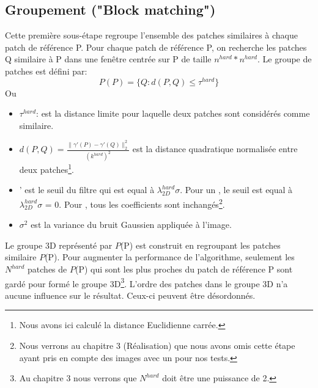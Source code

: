 \subsection{Groupement ("Block matching")}
Cette première sous-étape regroupe l'ensemble des patches similaires à chaque patch de référence P. Pour chaque patch de référence P, on recherche les patches Q similaire à P dans une fenêtre centrée sur P de taille \(n^{hard} * n^{hard}\). Le groupe de patches est défini par: 
\begin{equation}
P(P) = \{Q: d(P,Q) \leq \tau^{hard}\}
\end{equation}
\newline
Ou
\begin{itemize}
\item \( \tau^{hard} \): est la distance limite pour laquelle deux patches sont considérés comme similaire.
\item \(d(P,Q) = \frac{\parallel \gamma' (P) - \gamma'(Q) \parallel_2^2}{(k^{hard})^2} \) est la distance quadratique normalisée entre deux patches\footnote{Nous avons ici calculé la distance Euclidienne carrée.}.
\item \gamma' est le seuil du filtre qui est equal à \(\lambda^{hard}_{2D}\sigma \). Pour un \sigma {}, le seuil est equal à \(\lambda^{hard}_{2D}\sigma \) = 0. Pour \sigma {}, tous les coefficients sont inchangés\footnote{Nous verrons au chapitre 3 (Réalisation) que nous avons omis cette étape ayant pris en compte des images avec un \sigma {} pour nos tests.}.  
\item \(\sigma^2\) \: est la variance du bruit Gaussien appliquée à l'image.
\end{itemize}

Le groupe 3D représenté par \(P \)(P) est construit en regroupant les patches similaire \(P \)(P). Pour augmenter la performance de l'algorithme, seulement les \(N^{hard} \) patches de \(P \)(P) qui sont les plus proches du patch de référence P sont gardé pour formé le groupe 3D\footnote{Au chapitre 3 nous verrons que \(N^{hard} \) doit être une puissance de 2.}. L'ordre des patches dans le groupe 3D n'a aucune influence sur le résultat. Ceux-ci peuvent être désordonnés. 
\newpage
